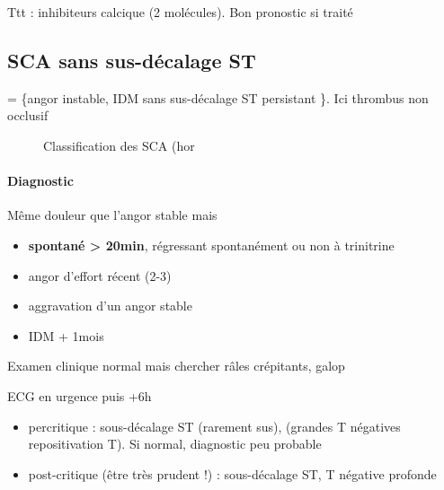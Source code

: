 \documentclass{article}
\begin{document}
Ttt : inhibiteurs calcique (2 molécules).
Bon pronostic si traité

\subsection{SCA sans sus-décalage ST}

= \{angor instable, IDM sans sus-décalage ST persistant \}. Ici thrombus non
occlusif

\begin{figure}[htpb]
  \centering
  \caption{Classification des SCA (hor}
\end{figure}

\paragraph{Diagnostic}
Même douleur que l'angor stable mais 
\begin{itemize}
  \item \textbf{spontané > 20min}, régressant spontanément ou non à trinitrine
  \item angor d'effort récent (2-3)
  \item aggravation d'un angor stable
  \item IDM + 1mois
\end{itemize}
Examen clinique normal mais chercher râles crépitants, galop

ECG en urgence \skull puis +6h
\begin{itemize}
  \item percritique : sous-décalage ST (rarement sus), (grandes T négatives \lor{}
    repositivation T). Si normal, diagnostic peu probable
  \item post-critique (être très prudent !) : sous-décalage ST, T négative
    profonde
\end{itemize}
\end{document}
